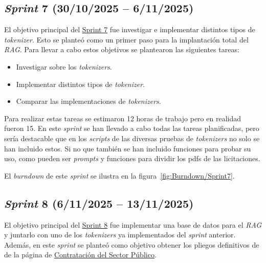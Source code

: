 \subsection{\textit{Sprint} 7 (30/10/2025 -- 6/11/2025)}

El objetivo principal del \href{https://github.com/lbr1014/TFG_RAG/milestone/7?closed=1}{Sprint 7} fue investigar e implementar distintos tipos de \textit{tokenizer}. Esto se planteó como un primer paso para la implantación total del \textit{RAG}.
Para llevar a cabo estos objetivos se plantearon las siguientes tareas:
\begin{itemize}
\tightlist
	\item Investigar sobre los \textit{tokenizers}.
	\item Implementar distintos tipos de \textit{tokenizer}.
	\item Comparar las implementaciones de \textit{tokenizers}.
\end{itemize}

Para realizar estas tareas se estimaron 12 horas de trabajo pero en realidad fueron 15. En este \textit{sprint} se han llevado a cabo todas las tareas planificadas, pero sería destacable que en los \textit{scripts} de las diversas pruebas de \textit{tokenizers} no solo se han incluido estos. Si no que también se han incluido funciones para probar su uso, como pueden ser \textit{prompts} y funciones para dividir los pdfs de las licitaciones.

El \textit{burndown} de este \textit{sprint} se ilustra en la figura~\ref{fig:Burndown/Sprint7}.

\subsection{\textit{Sprint} 8 (6/11/2025 -- 13/11/2025)}

El objetivo principal del \href{https://github.com/lbr1014/TFG_RAG/milestone/8?closed=1}{Sprint 8} fue implementar una base de datos para el \textit{RAG} y juntarlo con uno de los \textit{tokenizers} ya implementados del \textit{sprint} anterior. Además, en este \textit{sprint} se planteó como objetivo obtener los pliegos definitivos de de la página de \href{https://contrataciondelestado.es/wps/portal/plataforma/inicio/!ut/p/z1/04_Sj9CPykssy0xPLMnMz0vMAfIjo8zinYItLBydDB0NDIxDLQwczQIDnS1dDIwMLI31wwkpiAJKG-AAjgZA_VFgJabGziZhXmEBZsGe7gYGnh5uLj6hhqYG7kZmUAV4zCjIjTDIdFRUBAD_nKPx/dz/d5/L2dBISEvZ0FBIS9nQSEh/}{Contratación del Sector Público}. 

